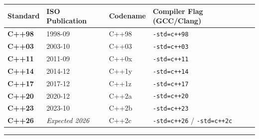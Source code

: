 \begin{longtable}[]{@{}llll@{}}
\toprule
Standard & ISO Publication & Codename & Compiler Flag (GCC/Clang) \\
\midrule
\endhead
\textbf{C++98} & 1998-09 & C++98 &
\passthrough{\lstinline!-std=c++98!} \\
\textbf{C++03} & 2003-10 & C++03 &
\passthrough{\lstinline!-std=c++03!} \\
\textbf{C++11} & 2011-09 & C++0x &
\passthrough{\lstinline!-std=c++11!} \\
\textbf{C++14} & 2014-12 & C++1y &
\passthrough{\lstinline!-std=c++14!} \\
\textbf{C++17} & 2017-12 & C++1z &
\passthrough{\lstinline!-std=c++17!} \\
\textbf{C++20} & 2020-12 & C++2a &
\passthrough{\lstinline!-std=c++20!} \\
\textbf{C++23} & 2023-10 & C++2b &
\passthrough{\lstinline!-std=c++23!} \\
\textbf{C++26} & \emph{Expected 2026} & C++2c &
\passthrough{\lstinline!-std=c++26!} /
\passthrough{\lstinline!-std=c++2c!} \\
\bottomrule
\end{longtable}

\begin{center}\rule{0.5\linewidth}{0.5pt}\end{center}
